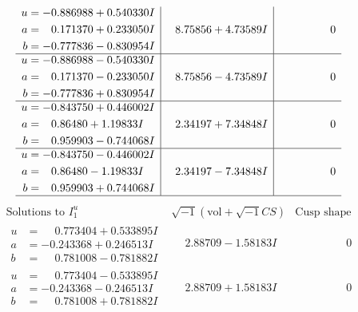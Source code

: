 \documentclass[1p]{elsarticle_modified}
\theoremstyle{definition}
\newcommand{\I}{\sqrt{-1}}
\begin{document}
$$\begin{array}{c|c|c}
\begin{aligned}
u &= -0.886988 + 0.540330 I \\
a &= \phantom{-}0.171370 + 0.233050 I \\
b &= -0.777836 - 0.830954 I\end{aligned}
 & \phantom{-}8.75856 + 4.73589 I & \phantom{-0.000000 } 0 \\ \hline\begin{aligned}
u &= -0.886988 - 0.540330 I \\
a &= \phantom{-}0.171370 - 0.233050 I \\
b &= -0.777836 + 0.830954 I\end{aligned}
 & \phantom{-}8.75856 - 4.73589 I & \phantom{-0.000000 } 0 \\ \hline\begin{aligned}
u &= -0.843750 + 0.446002 I \\
a &= \phantom{-}0.86480 + 1.19833 I \\
b &= \phantom{-}0.959903 - 0.744068 I\end{aligned}
 & \phantom{-}2.34197 + 7.34848 I & \phantom{-0.000000 } 0 \\ \hline\begin{aligned}
u &= -0.843750 - 0.446002 I \\
a &= \phantom{-}0.86480 - 1.19833 I \\
b &= \phantom{-}0.959903 + 0.744068 I\end{aligned}
 & \phantom{-}2.34197 - 7.34848 I & \phantom{-0.000000 } 0\\
 \hline 
 \end{array}$$\newpage$$\begin{array}{c|c|c}  
\text{Solutions to }I^u_{1}& \I (\text{vol} + \sqrt{-1}CS) & \text{Cusp shape}\\
 \hline 
\begin{aligned}
u &= \phantom{-}0.773404 + 0.533895 I \\
a &= -0.243368 + 0.246513 I \\
b &= \phantom{-}0.781008 - 0.781882 I\end{aligned}
 & \phantom{-}2.88709 - 1.58183 I & \phantom{-0.000000 } 0 \\ \hline\begin{aligned}
u &= \phantom{-}0.773404 - 0.533895 I \\
a &= -0.243368 - 0.246513 I \\
b &= \phantom{-}0.781008 + 0.781882 I\end{aligned}
 & \phantom{-}2.88709 + 1.58183 I & \phantom{-0.000000 } 0 \\ \hline\begin{aligned}

\end{aligned}
\end{array}$$
\end{document}
